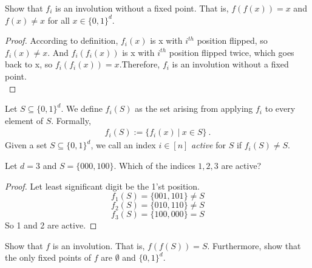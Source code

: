\begin{exercise}
 Show that $f_i$ is an involution without a fixed point.
 That is, $f(f(x)) = x$ and $f(x) \ne x$ for all $x \in \{0,1\}^d$.
\end{exercise}

\begin{proof}
According to definition, $f_i(x)$ is x with $i^{th}$ position flipped, so $f_i(x) \neq x$. And $f_i(f_i(x))$ is x with $i^{th}$
position flipped twice, which goes back to x, so $f_i(f_i(x)) = x$.Therefore, $f_i$ is an involution without a fixed point.\\
\end{proof}

Let $S \subseteq \{0,1\}^d$. We define  $f_i(S)$ as the set arising from applying
$f_i$ to every element of $S$. Formally,
\begin{align*}
f_i(S) := \{ f_i(x) \ | \ x \in S \} \ .
\end{align*}
Given a set $S \subseteq \{0,1\}^d$, we call an index $i \in [n]$ {\em active} for $S$
if $f_i(S) \ne S$. 
\begin{exercise}
Let $d=3$ and $S = \{000, 100\}$. Which of the indices $1,2,3$ are active?
\end{exercise}

\begin{proof}
Let least significant digit be the 1'st position.\\
\[f_1(S) = \{001,101\} \neq S\]
\[f_2(S) = \{010,110\} \neq S\]
\[f_3(S) = \{100,000\} = S\]
So 1 and 2 are active.
\end{proof}

\begin{exercise}
 Show that $f$ is an involution. That is, $f(f(S)) = S$. Furthermore, show that
 the only fixed points of $f$ are $\emptyset$ and $\{0,1\}^d$.
\end{exercise} 

